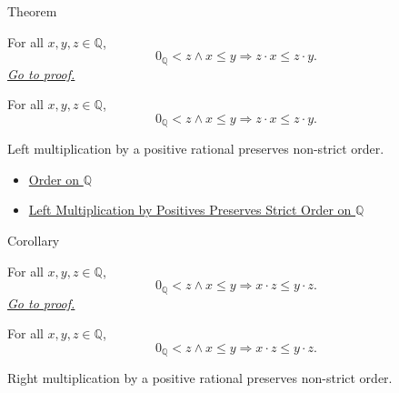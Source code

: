 \begin{theorembox}{Theorem}
\begin{theorem}
\label{thm:left-positive-multiplication-preserves-order-on-q}
For all $x,y,z\in\mathbb{Q}$,
\[
0_{\mathbb{Q}}<z\land x\le y
\Longrightarrow
z\cdot x\le z\cdot y.
\]
\hyperref[prf:left-positive-multiplication-preserves-order-on-q]{\textit{Go to proof.}}
\end{theorem}
\end{theorembox}

\begin{remark*}
For all $x,y,z\in\mathbb{Q}$,
\[
0_{\mathbb{Q}}<z\land x\le y
\Longrightarrow
z\cdot x\le z\cdot y.
\]
\end{remark*}

\begin{remark*}[Interpretation]
Left multiplication by a positive rational preserves non-strict order.
\end{remark*}

\begin{dependencies}
\begin{itemize}
  \item \hyperref[def:order-on-q]{Order on $\mathbb{Q}$}
  \item \hyperref[thm:left-positive-multiplication-preserves-strict-order-on-q]{Left Multiplication by Positives Preserves Strict Order on $\mathbb{Q}$}
\end{itemize}
\end{dependencies}

\begin{corollarybox}{Corollary}
\begin{corollary}
\label{cor:right-positive-multiplication-preserves-order-on-q}
For all $x,y,z\in\mathbb{Q}$,
\[
0_{\mathbb{Q}}<z\land x\le y
\Longrightarrow
x\cdot z\le y\cdot z.
\]
\hyperref[prf:right-positive-multiplication-preserves-order-on-q]{\textit{Go to proof.}}
\end{corollary}
\end{corollarybox}

\begin{remark*}
For all $x,y,z\in\mathbb{Q}$,
\[
0_{\mathbb{Q}}<z\land x\le y
\Longrightarrow
x\cdot z\le y\cdot z.
\]
\end{remark*}

\begin{remark*}[Interpretation]
Right multiplication by a positive rational preserves non-strict order.
\end{remark*}

